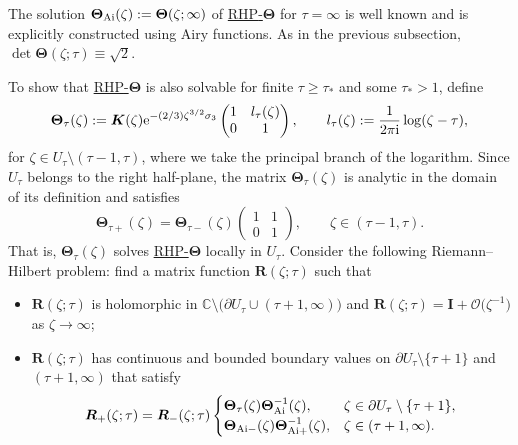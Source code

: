 \documentclass[10pt,a4paper]{amsart}
\numberwithin{equation}{section}
\newcommand{\C}		{\mathbb{C}}
\renewcommand{\det}{\operatorname{det}}
\newcommand{\ic}{\mathrm{i}}
\newcommand{\rhth} {\textnormal{RHP}-${\boldsymbol \Theta}$}
\begin{document}
The solution $ \boldsymbol\Theta_{\rm Ai}(\zeta) := \boldsymbol\Theta(\zeta;\infty) $ of \hyperref[rhth]{\rhth} for $ \tau=\infty $ is well known \cite{DKMLVZ99b} and is explicitly constructed using Airy functions. As in the previous subsection, $ \det \boldsymbol\Theta(\zeta;\tau) \equiv \sqrt 2 $.

To show that \hyperref[rhth]{\rhth} is also solvable for finite $ \tau\geq\tau_* $ and some $ \tau_*>1 $, define
\[
\boldsymbol\Theta_\tau(\zeta) := \boldsymbol K(\zeta) {\rm e}^{-(2/3)\zeta^{3/2}\sigma_3} \begin{pmatrix} 1 & l_\tau(\zeta) \\ 0 & 1 \end{pmatrix}, \qquad l_\tau(\zeta) := \frac1{2\pi\ic} \log(\zeta-\tau),
\]
for $ \zeta\in U_\tau\setminus(\tau-1,\tau) $, where we take the principal branch of the logarithm. Since $ U_\tau $ belongs to the right half-plane, the matrix $ \boldsymbol\Theta_\tau(\zeta) $ is analytic in the domain of its definition and satisfies
\[
\boldsymbol\Theta_{\tau+}(\zeta) = \boldsymbol\Theta_{\tau-}(\zeta) \begin{pmatrix} 1 & 1 \\ 0 & 1 \end{pmatrix}, \qquad \zeta\in(\tau-1,\tau).
\]
That is, $ \boldsymbol\Theta_\tau(\zeta) $ solves \hyperref[rhth]{\rhth} locally in $ U_\tau $. Consider the following Riemann--Hilbert problem: find a matrix function $ \boldsymbol R(\zeta;\tau) $ such that
\begin{itemize}\itemsep=0pt
\item[(a)] $\boldsymbol R(\zeta;\tau)$ is holomorphic in $ \C\setminus \bigl(\partial U_\tau \cup (\tau+1,\infty)\bigr) $ and $ \boldsymbol R(\zeta;\tau) = \boldsymbol I + \boldsymbol{\mathcal O}\bigl(\zeta^{-1}\bigr) $ as $ \zeta\to\infty $;
\item[(b)] $\boldsymbol R(\zeta;\tau)$ has continuous and bounded boundary values on $\partial U_\tau\setminus\{\tau+1\}$ and $ (\tau+1,\infty) $ that satisfy
\[
\boldsymbol R_+(\zeta;\tau) = \boldsymbol R_-(\zeta;\tau) \begin{cases}
\boldsymbol\Theta_\tau(\zeta)\boldsymbol\Theta_{\rm Ai}^{-1}(\zeta), & \zeta\in \partial U_\tau\setminus\{\tau+1\}, \\
\boldsymbol\Theta_{{\rm Ai}-}(\zeta)\boldsymbol\Theta_{{\rm Ai}+}^{-1}(\zeta), & \zeta\in(\tau+1,\infty).
\end{cases}
\]
\end{itemize}
\end{document}
